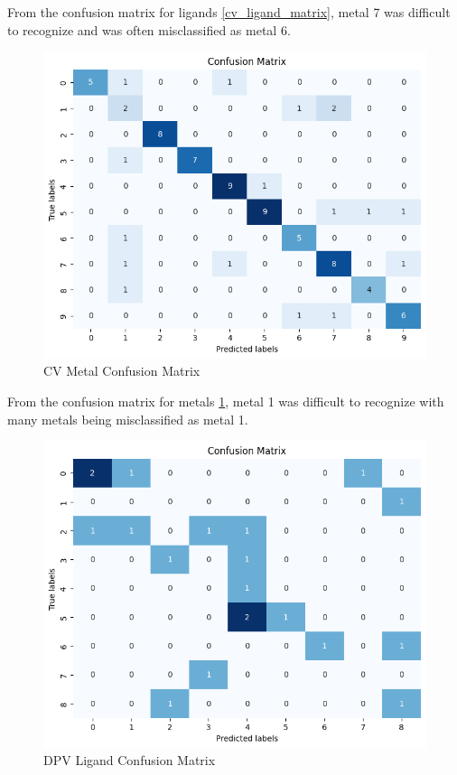 From the confusion matrix for ligands \ref{cv_ligand_matrix}, metal 7 was difficult to recognize and was often misclassified as metal 6. 
\begin{figure}[h!]
  \centering
    \includegraphics[width=1.0\textwidth]{figures/cv_metal_matrix.png}
    \caption{CV Metal Confusion Matrix}
    \label{cv_metal_matrix}
\end{figure}
From the confusion matrix for metals \ref{cv_metal_matrix}, metal 1 was difficult to recognize with many metals being misclassified as metal 1. 
\begin{figure}[h!]
  \centering
    \includegraphics[width=1.0\textwidth]{figures/dpv_ligand_matrix.png}
    \caption{DPV Ligand Confusion Matrix}
    \label{dpv_ligand_matrix}
\end{figure}
